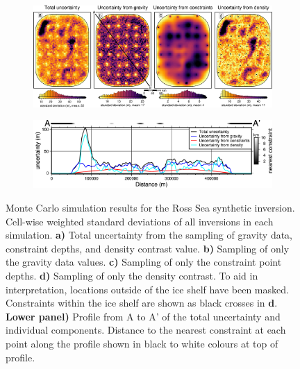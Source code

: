 \begin{figure}[!ht]
  \centering
    \begin{subfigure}[t]{.9\textwidth}
        \centering
        \includegraphics[width=\textwidth]{figures/chp3/chp3_Ross_Sea_monte_carlo.png}
    \end{subfigure}
    \begin{subfigure}[t]{.7\textwidth}
        \centering
        \includegraphics[width=\textwidth]{figures/chp3/chp3_Ross_Sea_monte_carlo_profile.png}
    \end{subfigure}
    \caption[Ross Sea Monte Carlo simulation]{Monte Carlo simulation results for the Ross Sea synthetic inversion. Cell-wise weighted standard deviations of all inversions in each simulation. \textbf{a)} Total uncertainty from the sampling of gravity data, constraint depths, and density contrast value. \textbf{b)} Sampling of only the gravity data values. \textbf{c)} Sampling of only the constraint point depths. \textbf{d)} Sampling of only the density contrast. To aid in interpretation, locations outside of the ice shelf have been masked. Constraints within the ice shelf are shown as black crosses in \textbf{d}. \textbf{Lower panel)} Profile from A to A' of the total uncertainty and individual components. Distance to the nearest constraint at each point along the profile shown in black to white colours at top of profile.}
    \label{fig:chp3_Ross_Sea_monte_carlo}
\end{figure}

